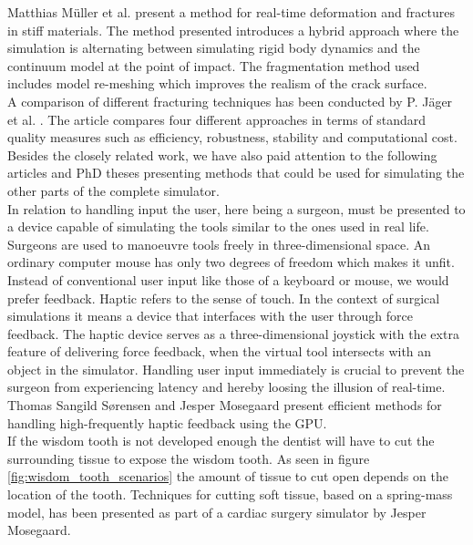 Matthias Müller et al.  present a method for
real-time deformation and fractures in stiff materials. The method
presented introduces a hybrid approach where the simulation is
alternating between simulating rigid body dynamics and the
continuum model at the point of impact. The fragmentation method used
includes model re-meshing which improves the realism of the crack
surface. \\ 

A comparison of different fracturing techniques has
been conducted by P. Jäger et al. . The article
compares four different approaches in terms of standard quality
measures such as efficiency, robustness, stability and computational
cost.\\ 

Besides the closely related work, we have also paid attention to the
following articles and PhD theses presenting methods that could be
used for simulating the other parts of the complete simulator. \\

In relation to handling input the user, here being a surgeon,
must be presented to a device capable of simulating the tools similar
to the ones used in real life. Surgeons are used to manoeuvre tools
freely in three-dimensional space. An ordinary computer 
mouse has only two degrees of freedom which makes it unfit. Instead of
conventional user input like those of a keyboard or mouse,
we would prefer  feedback. Haptic refers to the sense of
touch. In the context of surgical simulations it means a device that
interfaces with the user through force feedback. The haptic device
serves as a three-dimensional joystick with the extra feature of
delivering force feedback, when the virtual tool
intersects with an object in the simulator.
Handling user input immediately is crucial to prevent the surgeon from
experiencing latency and hereby loosing the illusion of real-time.   
Thomas Sangild Sørensen and Jesper
Mosegaard  present efficient methods for
handling high-frequently haptic feedback using the GPU. \\

If the wisdom tooth is not developed enough the dentist will have to
cut the surrounding tissue to expose the wisdom tooth. As seen in figure
\vref{fig:wisdom_tooth_scenarios} the amount of tissue to cut open depends on the
location of the tooth.
Techniques for cutting soft tissue, based on a spring-mass model, has
been presented as part of a cardiac surgery simulator by Jesper
Mosegaard. \\ 

